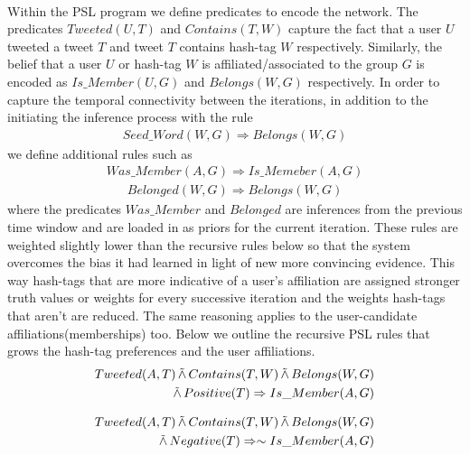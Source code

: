 \paragraph{}
Within the PSL program we define predicates to encode the network. 
The predicates $Tweeted(U,T)$ and $Contains(T,W)$  capture the fact that a user $U$ tweeted a tweet $T$ and tweet $T$ contains hash-tag $W$ respectively. 
Similarly, the belief that a user $U$ or hash-tag $W$ is affiliated/associated to the group $G$ is encoded as $Is\_Member(U,G)$ and $Belongs(W,G)$ respectively.
In order to capture the temporal connectivity between the iterations, in addition to the initiating the inference process with the rule
\begin{align*}
Seed\_Word(W,G) \Rightarrow Belongs(W,G)
\end{align*}
we define additional rules such as
\begin{align*}
Was\_Member(A,G) \Rightarrow Is\_Memeber(A,G)
\end{align*}
\begin{align*}
Belonged(W,G) \Rightarrow Belongs(W,G)
\end{align*}
where the predicates $Was\_Member$ and $Belonged$ are inferences from the previous time window and are loaded in as  priors for the current iteration.
These rules are weighted slightly lower than the recursive rules below so that the system overcomes the bias it had learned in light of new more convincing evidence.
This way hash-tags that are more indicative of a user's affiliation are assigned stronger truth values or weights for every successive iteration and the weights hash-tags that aren't are reduced.
The same reasoning applies to the user-candidate affiliations(memberships) too.
Below we outline the recursive PSL rules that grows the hash-tag preferences and the user affiliations. 
\begin{align*}
\begin{split}
Tweeted(A,T) 
	\softand Contains(T,W)
	\softand Belongs(W,G) \\ 
	\softand Positive(T)
	\Rightarrow Is\_Member(A,G)
\end{split}
\end{align*}

\begin{align*}
\begin{split}
Tweeted(A,T)
	 \softand Contains(T,W)
	\softand Belongs(W,G)\\
	 \softand Negative(T)
	\Rightarrow \sim Is\_Member(A,G)
\end{split}
\end{align*}

